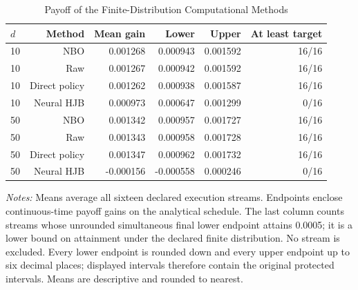 \begin{table}[!htbp]
\centering\small
\caption{Payoff of the Finite-Distribution Computational Methods}
\label{tab:r15methodmeans}
\begin{tabular}{lrrrrr}
\toprule
$d$ & Method & Mean gain & Lower & Upper & At least target \\
\midrule
10 & NBO & 0.001268 & 0.000943 & 0.001592 & 16/16 \\
10 & Raw & 0.001267 & 0.000942 & 0.001592 & 16/16 \\
10 & Direct policy & 0.001262 & 0.000938 & 0.001587 & 16/16 \\
10 & Neural HJB & 0.000973 & 0.000647 & 0.001299 & 0/16 \\
50 & NBO & 0.001342 & 0.000957 & 0.001727 & 16/16 \\
50 & Raw & 0.001343 & 0.000958 & 0.001728 & 16/16 \\
50 & Direct policy & 0.001347 & 0.000962 & 0.001732 & 16/16 \\
50 & Neural HJB & -0.000156 & -0.000558 & 0.000246 & 0/16 \\
\bottomrule
\end{tabular}
\par\medskip\noindent\begin{minipage}{\linewidth}\footnotesize\emph{Notes:} Means average all sixteen declared execution streams. Endpoints enclose continuous-time payoff gains on the analytical schedule. The last column counts streams whose unrounded simultaneous final lower endpoint attains 0.0005; it is a lower bound on attainment under the declared finite distribution. No stream is excluded. Every lower endpoint is rounded down and every upper endpoint up to six decimal places; displayed intervals therefore contain the original protected intervals. Means are descriptive and rounded to nearest.
\end{minipage}
\end{table}
